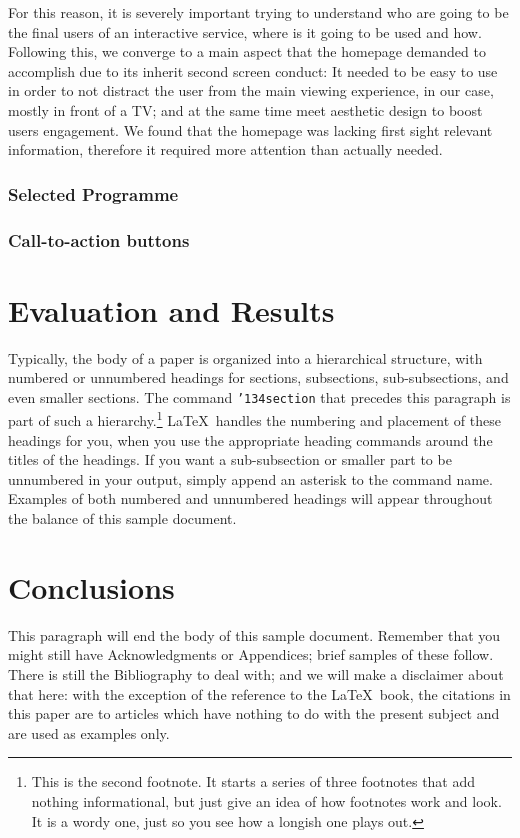 \documentclass{acm_proc_article-sp}
\begin{document}
For this reason, it is severely important trying to understand who are going to be the final users of an interactive service, where is it going to be used and how. Following this, we converge to a main aspect that the homepage demanded to accomplish due to its inherit second screen conduct: It needed to be easy to use in order to not distract the user from the main viewing experience, in our case, mostly in front of a TV; and at the same time meet aesthetic design to boost users engagement. We found that the homepage  was lacking first sight relevant information, therefore it required more attention than actually needed. 

\cite{nielsen2002homepage}
\subsubsection{Selected Programme}

\subsubsection{Call-to-action buttons}

\section{Evaluation and Results}
Typically, the body of a paper is organized
into a hierarchical structure, with numbered or unnumbered
headings for sections, subsections, sub-subsections, and even
smaller sections.  The command \texttt{{\char'134}section} that
precedes this paragraph is part of such a
hierarchy.\footnote{This is the second footnote.  It
starts a series of three footnotes that add nothing
informational, but just give an idea of how footnotes work
and look. It is a wordy one, just so you see
how a longish one plays out.} \LaTeX\ handles the numbering
and placement of these headings for you, when you use
the appropriate heading commands around the titles
of the headings.  If you want a sub-subsection or
smaller part to be unnumbered in your output, simply append an
asterisk to the command name.  Examples of both
numbered and unnumbered headings will appear throughout the
balance of this sample document.

\section{Conclusions}
This paragraph will end the body of this sample document.
Remember that you might still have Acknowledgments or
Appendices; brief samples of these
follow.  There is still the Bibliography to deal with; and
we will make a disclaimer about that here: with the exception
of the reference to the \LaTeX\ book, the citations in
this paper are to articles which have nothing to
do with the present subject and are used as
examples only.
\end{document}
